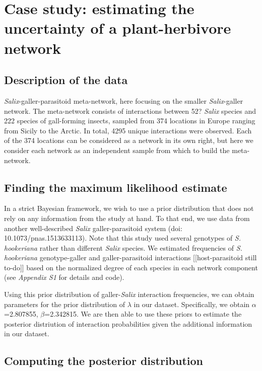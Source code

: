 \documentclass[12pt]{article}
\begin{document}
\section*{Case study: estimating the uncertainty of a plant-herbivore network}

    \subsection*{Description of the data}

      \emph{Salix}-galler-parasitoid meta-network, here focusing on the smaller \emph{Salix}-galler network. The meta-network consists of interactions between 52? \emph{Salix} species and 222 species of gall-forming insects, sampled from 374 locations in Europe ranging from Sicily to the Arctic. In total, 4295 unique interactions were observed. Each of the 374 locations can be considered as a network in its own right, but here we consider each network as an independent sample from which to build the meta-network.


  \subsection*{Finding the maximum likelihood estimate}

      In a strict Bayesian framework, we wish to use a prior distribution that does not rely on any information from the study at hand. To that end, we use data from another well-described \emph{Salix} galler-parasitoid system (doi: 10.1073/pnas.1513633113). Note that this study used several genotypes of \emph{S. hookeriana} rather than different \emph{Salix} species. We estimated frequencies of  \emph{S. hookeriana} genotype-galler and galler-parasitoid interactions [[host-parasitoid still to-do]] based on the normalized degree of each species in each network component (see \emph{Appendix S1} for details and code).


      Using this prior distribution of galler-\emph{Salix} interaction frequencies, we can obtain parameters for the prior distribution of $\lambda$ in our dataset. Specifically, we obtain $\alpha$=2.807855, $\beta$=2.342815. We are then able to use these priors to estimate the posterior distriution of interaction probabilities given the additional information in our dataset.


    \subsection*{Computing the posterior distribution}
\end{document}
